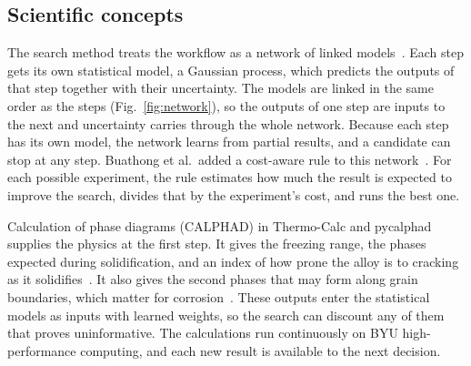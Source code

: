 \documentclass[12pt,letterpaper]{article}
\begin{document}
\subsection{Scientific concepts}

The search method treats the workflow as a network of linked
models~\cite{astudillo2021}. Each step gets its own statistical model, a
Gaussian process, which predicts the outputs of that step together with their
uncertainty. The models are linked in the same order as the steps
(Fig.~\ref{fig:network}), so the outputs of one step are inputs to the next
and uncertainty carries through the whole network. Because each step has its
own model, the network learns from partial results, and a candidate can stop
at any step. Buathong et al.\ added a cost-aware rule to this
network~\cite{buathong2024}. For each possible experiment, the rule estimates
how much the result is expected to improve the search, divides that by the
experiment's cost, and runs the best one.

Calculation of phase diagrams (CALPHAD) in Thermo-Calc and
pycalphad~\cite{andersson2002,otis2017} supplies the physics at the first
step. It gives the freezing range, the phases expected during
solidification, and an index of how prone the alloy is to cracking as it
solidifies~\cite{kou2015}. It also gives the second phases that may form
along grain boundaries, which matter for corrosion~\cite{birbilis2005}. These outputs enter the statistical models as
inputs with learned weights, so the search can discount any of them that
proves uninformative. The calculations run continuously on BYU
high-performance computing, and each new result is available to the next
decision.
\end{document}
